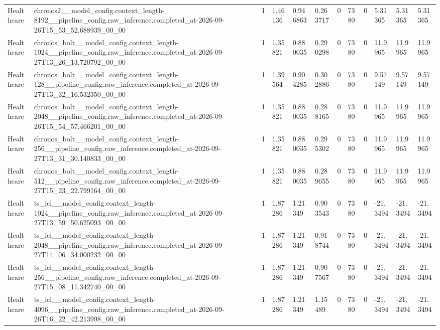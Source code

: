 \begin{tabular}{llllllllllll}
Healthcare & chronos2\_\_model\_config.context\_length-8192\_\_pipeline\_config.raw\_inference.completed\_at-2026-09-26T15\_53\_52.688939\_00\_00 & 1 & 1.46136 & 0.946863 & 0.263717 & 0 & 7380 & 0 & 5.31365 & 5.31365 & 5.31365 \\
Healthcare & chronos\_bolt\_\_model\_config.context\_length-1024\_\_pipeline\_config.raw\_inference.completed\_at-2026-09-27T13\_26\_13.720792\_00\_00 & 1 & 1.35821 & 0.880035 & 0.290298 & 0 & 7380 & 0 & 11.9965 & 11.9965 & 11.9965 \\
Healthcare & chronos\_bolt\_\_model\_config.context\_length-128\_\_pipeline\_config.raw\_inference.completed\_at-2026-09-27T13\_32\_16.532350\_00\_00 & 1 & 1.39564 & 0.904285 & 0.302886 & 0 & 7380 & 0 & 9.57149 & 9.57149 & 9.57149 \\
Healthcare & chronos\_bolt\_\_model\_config.context\_length-2048\_\_pipeline\_config.raw\_inference.completed\_at-2026-09-26T15\_54\_57.466201\_00\_00 & 1 & 1.35821 & 0.880035 & 0.288165 & 0 & 7380 & 0 & 11.9965 & 11.9965 & 11.9965 \\
Healthcare & chronos\_bolt\_\_model\_config.context\_length-256\_\_pipeline\_config.raw\_inference.completed\_at-2026-09-27T13\_31\_30.140833\_00\_00 & 1 & 1.35821 & 0.880035 & 0.295302 & 0 & 7380 & 0 & 11.9965 & 11.9965 & 11.9965 \\
Healthcare & chronos\_bolt\_\_model\_config.context\_length-512\_\_pipeline\_config.raw\_inference.completed\_at-2026-09-27T15\_23\_22.799164\_00\_00 & 1 & 1.35821 & 0.880035 & 0.289655 & 0 & 7380 & 0 & 11.9965 & 11.9965 & 11.9965 \\
Healthcare & ts\_icl\_\_model\_config.context\_length-1024\_\_pipeline\_config.raw\_inference.completed\_at-2026-09-27T13\_59\_50.625093\_00\_00 & 1 & 1.87286 & 1.21349 & 0.903543 & 0 & 7380 & 0 & -21.3494 & -21.3494 & -21.3494 \\
Healthcare & ts\_icl\_\_model\_config.context\_length-2048\_\_pipeline\_config.raw\_inference.completed\_at-2026-09-27T14\_06\_34.000232\_00\_00 & 1 & 1.87286 & 1.21349 & 0.918744 & 0 & 7380 & 0 & -21.3494 & -21.3494 & -21.3494 \\
Healthcare & ts\_icl\_\_model\_config.context\_length-256\_\_pipeline\_config.raw\_inference.completed\_at-2026-09-27T15\_08\_11.342740\_00\_00 & 1 & 1.87286 & 1.21349 & 0.907567 & 0 & 7380 & 0 & -21.3494 & -21.3494 & -21.3494 \\
Healthcare & ts\_icl\_\_model\_config.context\_length-4096\_\_pipeline\_config.raw\_inference.completed\_at-2026-09-26T16\_22\_42.213998\_00\_00 & 1 & 1.87286 & 1.21349 & 1.15489 & 0 & 7380 & 0 & -21.3494 & -21.3494 & -21.3494 \\

\end{tabular}
